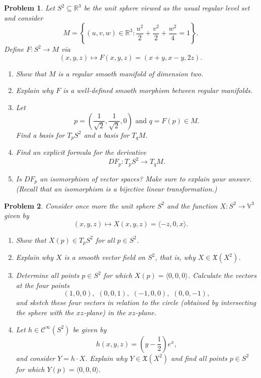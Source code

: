 \documentclass[reqno]{amsart}
\theoremstyle{plain}
\newtheorem{problem}{Problem}
\theoremstyle{definition}
\begin{document}
\begin{problem}
Let $S^{2} \subseteq \mathbb{R}^{3}$ be the unit sphere viewed as the usual regular level set and consider
$$M = \left\{(u,v,w) \in \mathbb{R}^{3}: \frac{u^{2}}{2} + \frac{v^{2}}{2} + \frac{w^{2}}{4} = 1 \right\}. $$
Define $F:S^{2} \rightarrow M$ via
$$(x,y,z) \mapsto F(x,y,z) = (x+y,x-y,2z). $$
\begin{enumerate}
\item Show that $M$ is a regular smooth manifold of dimension two.
\item Explain why $F$ is a well-defined smooth morphism between regular manifolds.
\item Let 
$$p = \left(\frac{1}{\sqrt{2}},\frac{1}{\sqrt{2}},0 \right) \text{ and } q = F(p) \in M.$$
Find a basis for $T_{p}S^{2}$ and a basis for $T_{q}M$.
\item Find an explicit formula for the derivative
$$DF_{p}:T_{p}S^{2} \rightarrow T_{q}M. $$
\item Is $DF_{p}$ an isomorphism of vector spaces?  Make sure to explain your answer.  (Recall that an isomorphism is a bijective linear transformation.)
\end{enumerate}
\end{problem}



\begin{problem}
Consider once more the unit sphere $S^{2}$ and the function $X: S^{2} \rightarrow \mathbb{V}^{3}$ given by
$$(x,y,z) \mapsto X(x,y,z) = \langle-z,0,x \rangle.$$
\begin{enumerate}
\item Show that $X(p) \in T_{p}S^{2}$ for all $p \in S^{2}$.
\item Explain why $X$ is a smooth vector field on $S^{2}$, that is, why $X \in \mathfrak{X}(X^{2})$.
\item Determine all points $p \in S^{2}$ for which $X(p) = \langle 0,0,0 \rangle$.  Calculate the vectors at the four points
$$(1,0,0), \, \, (0,0,1), \, \, (-1,0,0), \, \, (0,0,-1), $$
and sketch these four vectors in relation to the circle (obtained by intersecting the sphere with the $xz$-plane) in the $xz$-plane.
\item Let $h \in \mathcal{C}^{\infty}(S^{2})$ be given by
$$h(x,y,z) = \left(y - \frac{1}{2} \right)e^{x}, $$
and consider $Y = h \cdot X$.  Explain why $Y \in \mathfrak{X}(X^{2})$ and find all points $p \in S^{2}$ for which $Y(p) = \langle 0,0,0 \rangle.$
\end{enumerate}
\end{problem}
\end{document}
